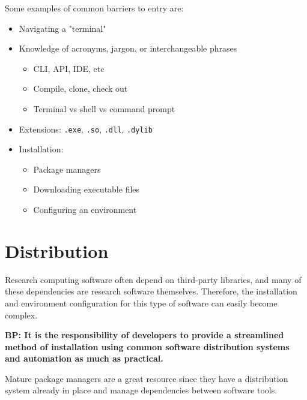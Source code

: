 \documentclass[]{nrel}
\begin{document}
Some examples of common barriers to entry are:
\begin{itemize}
\item Navigating a "terminal"

\item Knowledge of acronyms, jargon, or interchangeable phrases
\begin{itemize}
\item CLI, API, IDE, etc

\item Compile, clone, check out

\item Terminal vs shell vs command prompt

\end{itemize}

\item Extensions: \lstinline{.exe}, \lstinline{.so}, \lstinline{.dll}, \lstinline{.dylib}

\item Installation:
\begin{itemize}
\item Package managers

\item Downloading executable files

\item Configuring an environment

\end{itemize}

\end{itemize}


\section{Distribution}
Research computing software often depend on third-party libraries, and many of these dependencies
are research software themselves. Therefore, the installation and environment configuration
for this type of software can easily become complex.

\textbf{BP: It is the responsibility of developers to provide a streamlined method of installation using
common software distribution systems and automation as much as practical.}

Mature package managers are a great resource since they have a distribution system already in place
and manage dependencies between software tools.
\end{document}
